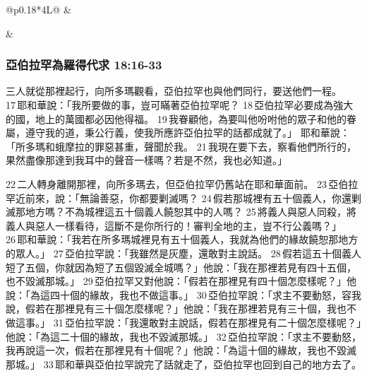 \begin{table}[!hbp]
\begin{threeparttable}
\begin{tabular}{@{}p{}*{4}{L{\tabcolsep\relax}}@{}}
& \\\hline

& \\\hline

\end{tabular}
\caption{神在幔利橡樹應許撒拉生以撒}
\label{table:GodPromiseIsaac}
\end{threeparttable}
\end{table}

\subsubsection{亞伯拉罕為羅得代求 18:16-33}
三人就從那裡起行，向所多瑪觀看，亞伯拉罕也與他們同行，要送他們一程。 17 耶和華說：「我所要做的事，豈可瞞著亞伯拉罕呢？ 18 亞伯拉罕必要成為強大的國，地上的萬國都必因他得福。 19 我眷顧他，為要叫他吩咐他的眾子和他的眷屬，遵守我的道，秉公行義，使我所應許亞伯拉罕的話都成就了。」
耶和華說：「所多瑪和蛾摩拉的罪惡甚重，聲聞於我。 21 我現在要下去，察看他們所行的，果然盡像那達到我耳中的聲音一樣嗎？若是不然，我也必知道。」

22 二人轉身離開那裡，向所多瑪去，但亞伯拉罕仍舊站在耶和華面前。 23 亞伯拉罕近前來，說：「無論善惡，你都要剿滅嗎？ 24 假若那城裡有五十個義人，你還剿滅那地方嗎？不為城裡這五十個義人饒恕其中的人嗎？ 25 將義人與惡人同殺，將義人與惡人一樣看待，這斷不是你所行的！審判全地的主，豈不行公義嗎？」 26 耶和華說：「我若在所多瑪城裡見有五十個義人，我就為他們的緣故饒恕那地方的眾人。」 27 亞伯拉罕說：「我雖然是灰塵，還敢對主說話。 28 假若這五十個義人短了五個，你就因為短了五個毀滅全城嗎？」他說：「我在那裡若見有四十五個，也不毀滅那城。」 29 亞伯拉罕又對他說：「假若在那裡見有四十個怎麼樣呢？」他說：「為這四十個的緣故，我也不做這事。」 30 亞伯拉罕說：「求主不要動怒，容我說，假若在那裡見有三十個怎麼樣呢？」他說：「我在那裡若見有三十個，我也不做這事。」 31 亞伯拉罕說：「我還敢對主說話，假若在那裡見有二十個怎麼樣呢？」他說：「為這二十個的緣故，我也不毀滅那城。」 32 亞伯拉罕說：「求主不要動怒，我再說這一次，假若在那裡見有十個呢？」他說：「為這十個的緣故，我也不毀滅那城。」 33 耶和華與亞伯拉罕說完了話就走了，亞伯拉罕也回到自己的地方去了。

